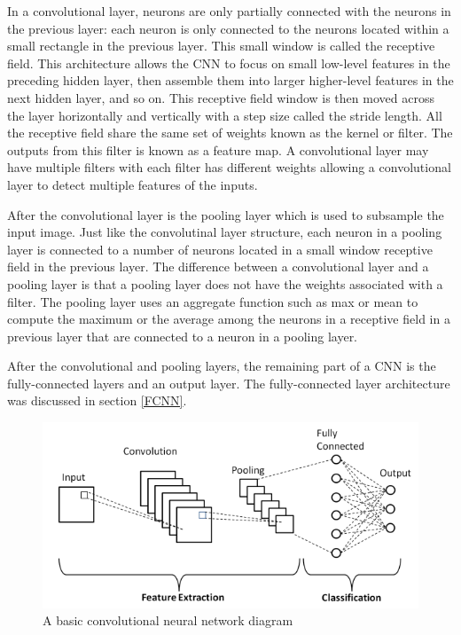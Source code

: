 \documentclass{article}
\begin{document}
In a convolutional layer, neurons are only partially connected with the neurons in the previous layer: each neuron is only connected to the neurons located within a small rectangle in the previous layer. This small window is called the receptive field. This architecture allows the CNN to focus on small low-level features in the preceding hidden layer, then assemble them into larger higher-level features in the next hidden layer, and so on. This receptive field window is then moved across the layer horizontally and vertically with a step size called the stride length. All the receptive field share the same set of weights known as the kernel or filter. The outputs from this filter is known as a feature map. A convolutional layer may have multiple filters with each filter has different weights allowing a convolutional layer to detect multiple features of the inputs. 

After the convolutional layer is the pooling layer which is used to subsample the input image. Just like the convolutinal layer structure, each neuron in a pooling layer is connected to a number of neurons located in a small window receptive field in the previous layer. The difference between a convolutional layer and a pooling layer is that a pooling layer does not have the weights associated with a filter. The pooling layer uses an aggregate function such as max or mean to compute the maximum or the average among the neurons in a receptive field in a previous layer that are connected to a neuron in a pooling layer.

After the convolutional and pooling layers, the remaining part of a CNN is the fully-connected layers and an output layer. The fully-connected layer architecture was discussed in section \ref{FCNN}.

\begin{figure}
\centering
\includegraphics[width=1.0\textwidth]{CNN-architecture.png}
\caption{A basic convolutional neural network diagram}
\label{fig:CNN}
\end{figure}
\end{document}
